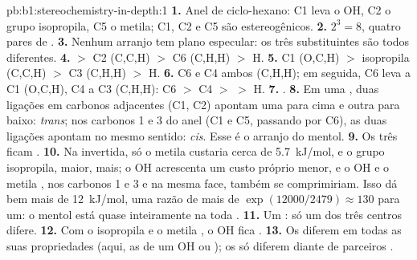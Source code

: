 \begin{solution}{pb:b1:stereochemistry-in-depth:1}
\textbf{1.} Anel de ciclo-hexano: C1 leva o OH, C2 o grupo isopropila,
C5 o metila; C1, C2 e C5 são estereogênicos.
\textbf{2.} $2^3 = 8$, quatro pares de .
\textbf{3.} Nenhum arranjo tem plano especular: os três substituintes
são todos diferentes.
\textbf{4.}  $>$ C2 (C,C,H) $>$ C6 (C,H,H) $>$ H.
\textbf{5.} C1 (O,C,H) $>$ isopropila (C,C,H) $>$ C3 (C,H,H) $>$ H.
\textbf{6.} C6 e C4 ambos (C,H,H); em seguida, C6 leva a C1 (O,C,H), C4 a
C3 (C,H,H): C6 $>$ C4 $>$  $>$ H.
\textbf{7.} .
\textbf{8.} Em uma , duas ligações  em carbonos
adjacentes (C1, C2) apontam uma para cima e outra para baixo:
\textit{trans}; nos carbonos 1 e 3 do anel (C1 e C5, passando por C6),
as duas ligações  apontam no mesmo sentido: \textit{cis}. Esse
é o arranjo do mentol.
\textbf{9.} Os três ficam .
\textbf{10.} Na  invertida, só o metila custaria cerca de
\qty{5.7}{kJ/mol}, e o grupo isopropila, maior, mais; o OH acrescenta um
custo próprio menor, e o OH e o metila , nos carbonos 1 e 3 e na
mesma face, também se comprimiriam. Isso dá bem mais de \qty{12}{kJ/mol},
uma razão de mais de $\exp(12000/2479) \approx 130$ para um: o mentol
está quase inteiramente na  toda .
\textbf{11.} Um : só um dos três centros difere.
\textbf{12.} Com o isopropila e o metila , o OH fica .
\textbf{13.} Os  diferem em todas as suas propriedades
(aqui, as  de um OH  ou ); os
 só diferem diante de parceiros .

\end{solution}
